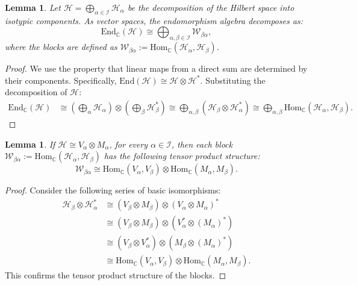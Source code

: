 \documentclass[11pt,letterpaper]{article}
\newcounter{alg}
\theoremstyle{plain}
\theoremstyle{plain}
\theoremstyle{plain}
\theoremstyle{plain}
\theoremstyle{plain}
\theoremstyle{plain}
\newcommand{\End}{\mathrm{End}}
\newcommand{\Hom}{\mathrm{Hom}}
\newcommand{\HH}{\mathcal{H}}
\theoremstyle{plain}
\newtheorem{smlemma}[smtheorem]{Lemma}
\theoremstyle{definition}
\theoremstyle{plain}
\begin{document}
\begin{smlemma}
    Let $\HH=\bigoplus_{\alpha\in \mathcal{I}} \mathcal{H}_\alpha$ be the decomposition of the Hilbert space into isotypic components. As vector spaces, the endomorphism algebra decomposes as:
    \begin{equation}\label{eq:endomorphism_decomposition}
        \End_{\mathbb{C}}(\mathcal{H}) \cong \bigoplus_{\alpha, \beta \in \mathcal{I}} \mathcal{W}_{\beta\alpha},
    \end{equation}
    where the blocks are defined as $\mathcal{W}_{\beta\alpha} := \Hom_{\mathbb{C}}(\mathcal{H}_\alpha, \mathcal{H}_\beta)$.
\end{smlemma}

\begin{proof}
    We use the property that linear maps from a direct sum are determined by their components. Specifically, $\End(\mathcal{H}) \cong \mathcal{H} \otimes \mathcal{H}^*$. Substituting the decomposition of $\mathcal{H}$:
    \begin{align*}
        \End_{\mathbb{C}}(\mathcal{H}) &\cong \left( \bigoplus_{\alpha} \mathcal{H}_\alpha \right) \otimes \left( \bigoplus_{\beta} \mathcal{H}_\beta^* \right) \cong \bigoplus_{\alpha, \beta} \left( \mathcal{H}_\beta \otimes \mathcal{H}_\alpha^* \right) \cong \bigoplus_{\alpha, \beta} \Hom_{\mathbb{C}}(\mathcal{H}_\alpha, \mathcal{H}_\beta).
    \end{align*}
\end{proof}

\begin{smlemma}
    If $\HH\cong V_\alpha \otimes M_\alpha$, for every $\alpha \in \mathcal{I}$, then each block $\mathcal{W}_{\beta\alpha}:=\Hom_{\mathbb{C}}(\mathcal{H}_\alpha, \mathcal{H}_\beta)$ has the following tensor product structure: 
    \begin{equation*}
        \mathcal{W}_{\beta\alpha} \cong \Hom_{\mathbb{C}}(V_\alpha, V_\beta) \otimes \Hom_{\mathbb{C}}(M_\alpha, M_\beta).
    \end{equation*}
\end{smlemma}

\begin{proof}
    Consider the following series of basic isomorphisms:
    \begin{align*}
        \mathcal{H}_\beta \otimes \mathcal{H}_\alpha^* &\cong (V_\beta \otimes M_{\beta}) \otimes (V_\alpha \otimes M_{\alpha})^* \\
        &\cong (V_\beta \otimes M_{\beta}) \otimes (V_\alpha^* \otimes (M_{\alpha})^*) \\
        &\cong (V_\beta \otimes V_\alpha^*) \otimes (M_{\beta} \otimes (M_{\alpha})^*) \\
        &\cong \Hom_{\mathbb{C}}(V_\alpha, V_\beta) \otimes \Hom_{\mathbb{C}}(M_\alpha, M_\beta).
    \end{align*}
    This confirms the tensor product structure of the blocks.
\end{proof}
\end{document}
